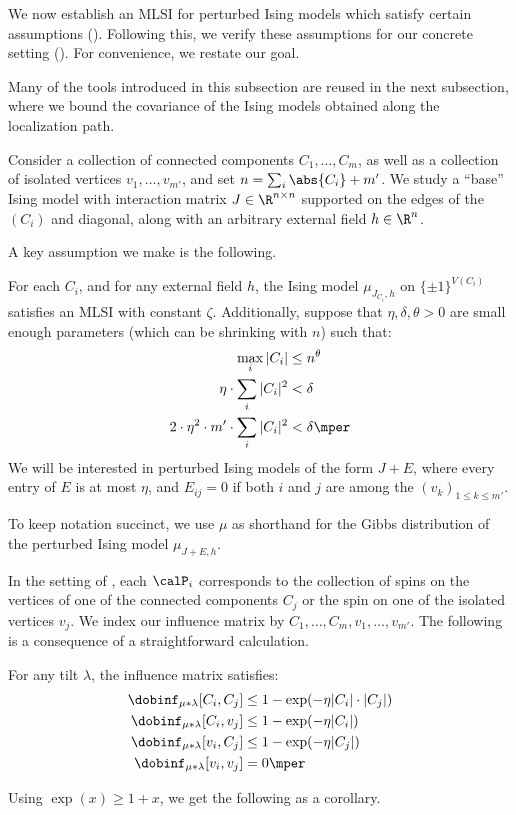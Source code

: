 \documentclass[11pt,letterpaper]{article}
\begin{document}
We now establish an MLSI for perturbed Ising models which satisfy certain assumptions (). Following this, we verify these assumptions for our concrete setting (). For convenience, we restate our goal.

\nearforestjunk*

Many of the tools introduced in this subsection are reused in the next subsection, where we bound the covariance of the Ising models obtained along the localization path.

 Consider a collection of connected components $C_1,\dots,C_m$, as well as a collection of isolated vertices $v_1,\dots,v_{m'}$, and set $n = \sum_{i} \abs{C_i} + m'$. We study a ``base'' Ising model with interaction matrix $J \in \R^{n \times n}$ supported on the edges of the $(C_i)$ and diagonal, along with an arbitrary external field $h \in \R^n$. 

A key assumption we make is the following.
\begin{assumption}  \label{ass:parameters}
    For each $C_i$, and for any external field $h$, the Ising model $\mu_{J_{C_i},h}$ on $\{\pm1\}^{V(C_i)}$ satisfies an MLSI with constant $\zeta$.
    Additionally, suppose that $\eta, \delta, \theta > 0$ are small enough parameters (which can be shrinking with $n$) such that:
    \begin{align*}
        \max_i |C_i| &\le n^{\theta} \\
        \eta \cdot \sum_i |C_i|^2 &< \delta \\
        2\cdot \eta^2\cdot m' \cdot \sum_i |C_i|^2 &< \delta\mper
    \end{align*}
    We will be interested in perturbed Ising models of the form $J+E$, where every entry of $E$ is at most $\eta$, and $E_{ij} = 0$ if both $i$ and $j$ are among the $(v_k)_{1 \le k \le m'}$.
\end{assumption}
To keep notation succinct, we use $\mu$ as shorthand for the Gibbs distribution of the perturbed Ising model $\mu_{J+E, h}$.

In the setting of , each $\calP_i$ corresponds to the collection of spins on the vertices of one of the connected components $C_j$ or the spin on one of the isolated vertices $v_j$.
We index our influence matrix by $C_1,\dots,C_m,v_1,\dots,v_{m'}$.
The following is a consequence of a straightforward calculation.

\begin{observation}
    For any tilt $\lambda$, the influence matrix satisfies:
    \begin{align*}
        \dobinf_{\mu\ast\lambda}[C_i, C_j] &\le 1 - \exp(-\eta |C_i|\cdot|C_j|) \\
        \dobinf_{\mu\ast\lambda}[C_i, v_j] &\le 1 - \exp(-\eta |C_i|) \\
        \dobinf_{\mu\ast\lambda}[v_i, C_j] &\le 1 - \exp(-\eta |C_j|) \\
        \dobinf_{\mu\ast\lambda}[v_i, v_j] &= 0\mper
    \end{align*}
\end{observation}
Using $\exp(x)\ge 1+x$, we get the following as a corollary.
\end{document}

